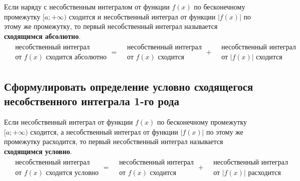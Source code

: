 \begin{definition}
    Если наряду с несобственным интегралом от функции $f(x)$ по бесконечному промежутку $[a;+\infty)$ сходится и несобственный интеграл от функции $|f(x)|$ по этому же промежутку, то первый несобственный интеграл называется \textbf{сходящимся абсолютно}.
    \begin{gather*}
        \boxed{\begin{aligned}
            &\text{несобственный интеграл} \\
            &\text{от $f(x)$ сходится абсолютно} 
        \end{aligned}} = \boxed{\begin{aligned}
            &\text{несобственный интеграл}  \\
            &\text{от $f(x)$ сходится}
        \end{aligned}} + \boxed{\begin{aligned}
            &\text{несобственный интеграл} \\
            &\text{от $|f(x)|$ сходится}
        \end{aligned}}
    \end{gather*}
\end{definition}

\newpage
\subsection{Сформулировать определение условно сходящегося несобственного интеграла 1-го рода}

\begin{definition}
    Если несобственный интеграл от функции $f(x)$ по бесконечному промежутку $[a;+\infty)$ сходится, а несобственный интеграл от функции $|f(x)|$ по этому же промежутку расходится, то первый несобственный интеграл называется \textbf{сходящимся условно}.
    \begin{gather*}
        \boxed{\begin{aligned}
                &\text{несобственный интеграл} \\
                &\text{от $f(x)$ сходится условно} 
            \end{aligned}} = \boxed{\begin{aligned}
                &\text{несобственный интеграл}  \\
                &\text{от $f(x)$ сходится}
            \end{aligned}} + \boxed{\begin{aligned}
                &\text{несобственный интеграл} \\
                &\text{от $|f(x)|$ расходится}
            \end{aligned}}
    \end{gather*}
\end{definition}

